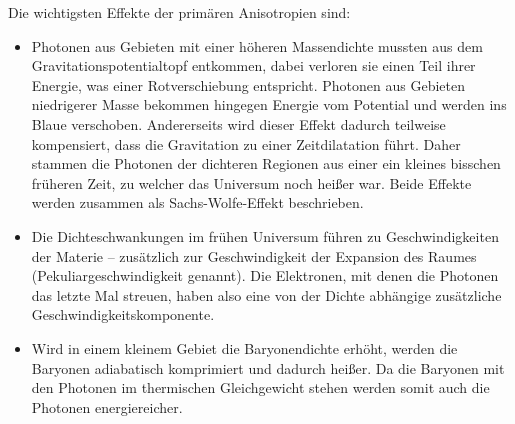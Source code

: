\documentclass[10pt,a4paper]{article}
\begin{document}
Die wichtigsten Effekte der primären Anisotropien sind:
\begin{itemize}
\item Photonen aus Gebieten mit einer höheren Massendichte mussten aus dem Gravitationspotentialtopf entkommen, dabei verloren sie einen Teil ihrer Energie, was einer Rotverschiebung entspricht. Photonen aus Gebieten niedrigerer Masse bekommen hingegen Energie vom Potential und werden ins Blaue verschoben. Andererseits wird dieser Effekt dadurch teilweise kompensiert, dass die Gravitation zu einer Zeitdilatation führt. Daher stammen die Photonen der dichteren Regionen aus einer ein kleines bisschen früheren Zeit, zu welcher das Universum noch heißer war. Beide Effekte werden zusammen als Sachs-Wolfe-Effekt beschrieben.\cite{Schneider} %
\item Die Dichteschwankungen im frühen Universum führen zu Geschwindigkeiten der Materie -- zusätzlich zur Geschwindigkeit der Expansion des Raumes (Pekuliargeschwindigkeit genannt). Die Elektronen, mit denen die Photonen das letzte Mal streuen, haben also eine von der Dichte abhängige zusätzliche Geschwindigkeitskomponente.\cite{Schneider} %
\item Wird in einem kleinem Gebiet die Baryonendichte erhöht, werden die Baryonen adiabatisch komprimiert und dadurch heißer. Da die Baryonen mit den Photonen im thermischen Gleichgewicht stehen werden somit auch die Photonen energiereicher.\cite{Schneider}
\end{itemize}
\end{document}
